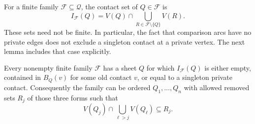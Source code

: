 For a finite family $\mathcal F\subseteq\mathcal Q$, the contact set of
$Q\in\mathcal F$ is
\[
 I_{\mathcal F}(Q)=V(Q)\cap
       \bigcup_{R\in\mathcal F\setminus\{Q\}}V(R).
\]
These sets need not be finite.  In particular, the fact that comparison
arcs have no private edges does not exclude a singleton contact at a
private vertex.  The next lemma includes that case explicitly.

\begin{lemma}
\label{lem:sheet-peeling}
Every nonempty finite family $\mathcal F$ has a sheet $Q$ for which
$I_{\mathcal F}(Q)$ is either empty, contained in $B_Q(v)$ for some old
contact $v$, or equal to a singleton private contact.
Consequently the family can be ordered $Q_1,\ldots,Q_n$ with allowed
removed sets $R_j$ of those three forms such that
\begin{equation}
 V(Q_j)\cap\bigcup_{\ell>j}V(Q_\ell)\subseteq R_j.
 \label{eq:finite-peeling-overlap}
\end{equation}
\end{lemma}

